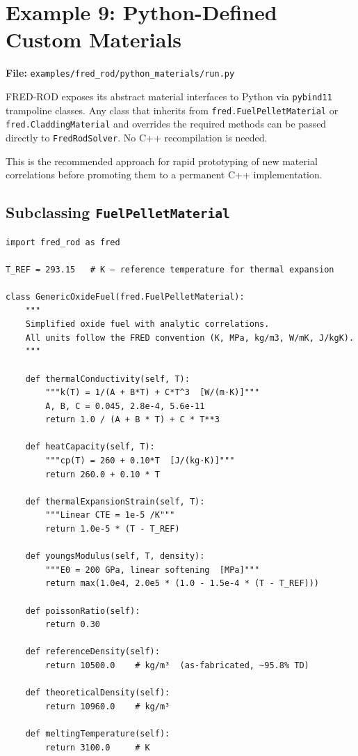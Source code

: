 \documentclass[11pt,a4paper]{article}
\begin{document}
\section{Example 9: Python-Defined Custom Materials}
\label{sec:pymat}

\textbf{File:} \texttt{examples/fred\_rod/python\_materials/run.py}

\medskip
FRED-ROD exposes its abstract material interfaces to Python via
\texttt{pybind11} trampoline classes.  Any class that inherits from
\texttt{fred.FuelPelletMaterial} or \texttt{fred.CladdingMaterial} and
overrides the required methods can be passed directly to
\texttt{FredRodSolver}.  No C++ recompilation is needed.

This is the recommended approach for rapid prototyping of new material
correlations before promoting them to a permanent C++ implementation.

\subsection{Subclassing \texttt{FuelPelletMaterial}}

\begin{lstlisting}
import fred_rod as fred

T_REF = 293.15   # K — reference temperature for thermal expansion

class GenericOxideFuel(fred.FuelPelletMaterial):
    """
    Simplified oxide fuel with analytic correlations.
    All units follow the FRED convention (K, MPa, kg/m3, W/mK, J/kgK).
    """

    def thermalConductivity(self, T):
        """k(T) = 1/(A + B*T) + C*T^3  [W/(m·K)]"""
        A, B, C = 0.045, 2.8e-4, 5.6e-11
        return 1.0 / (A + B * T) + C * T**3

    def heatCapacity(self, T):
        """cp(T) = 260 + 0.10*T  [J/(kg·K)]"""
        return 260.0 + 0.10 * T

    def thermalExpansionStrain(self, T):
        """Linear CTE = 1e-5 /K"""
        return 1.0e-5 * (T - T_REF)

    def youngsModulus(self, T, density):
        """E0 = 200 GPa, linear softening  [MPa]"""
        return max(1.0e4, 2.0e5 * (1.0 - 1.5e-4 * (T - T_REF)))

    def poissonRatio(self):
        return 0.30

    def referenceDensity(self):
        return 10500.0    # kg/m³  (as-fabricated, ~95.8% TD)

    def theoreticalDensity(self):
        return 10960.0    # kg/m³

    def meltingTemperature(self):
        return 3100.0     # K
\end{lstlisting}
\end{document}
